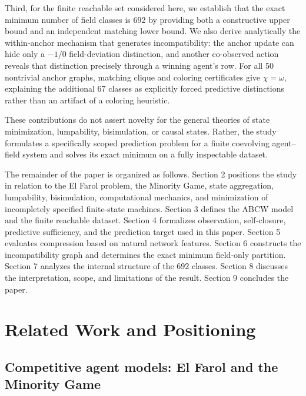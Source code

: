 \documentclass[
  11pt,
]{article}
\begin{document}
Third, for the finite reachable set considered here, we establish that
the exact minimum number of field classes is 692 by providing both a
constructive upper bound and an independent matching lower bound. We
also derive analytically the within-anchor mechanism that generates
incompatibility: the anchor update can hide only a \(-1/0\)
field-deviation distinction, and another co-observed action reveals that
distinction precisely through a winning agent's row. For all 50
nontrivial anchor graphs, matching clique and coloring certificates give
\(\chi=\omega\), explaining the additional 67 classes as explicitly
forced predictive distinctions rather than an artifact of a coloring
heuristic.

These contributions do not assert novelty for the general theories of
state minimization, lumpability, bisimulation, or causal states. Rather,
the study formulates a specifically scoped prediction problem for a
finite coevolving agent--field system and solves its exact minimum on a
fully inspectable dataset.

The remainder of the paper is organized as follows. Section 2 positions
the study in relation to the El Farol problem, the Minority Game, state
aggregation, lumpability, bisimulation, computational mechanics, and
minimization of incompletely specified finite-state machines. Section 3
defines the ABCW model and the finite reachable dataset. Section 4
formalizes observation, self-closure, predictive sufficiency, and the
prediction target used in this paper. Section 5 evaluates compression
based on natural network features. Section 6 constructs the
incompatibility graph and determines the exact minimum field-only
partition. Section 7 analyzes the internal structure of the 692 classes.
Section 8 discusses the interpretation, scope, and limitations of the
result. Section 9 concludes the paper.

\hypertarget{related-work-and-positioning}{%
\section{Related Work and
Positioning}\label{related-work-and-positioning}}

\hypertarget{competitive-agent-models-el-farol-and-the-minority-game}{%
\subsection{Competitive agent models: El Farol and the Minority
Game}\label{competitive-agent-models-el-farol-and-the-minority-game}}
\end{document}
